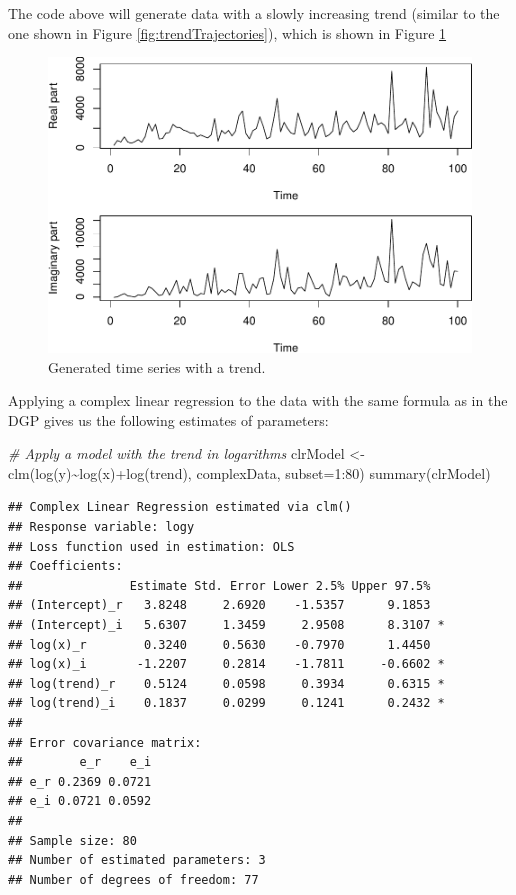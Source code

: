 \documentclass[
]{book}
\newenvironment{Shaded}{\begin{snugshade}}{\end{snugshade}}
\newcommand{\AttributeTok}[1]{\textcolor[rgb]{0.77,0.63,0.00}{#1}}
\newcommand{\CommentTok}[1]{\textcolor[rgb]{0.56,0.35,0.01}{\textit{#1}}}
\newcommand{\DecValTok}[1]{\textcolor[rgb]{0.00,0.00,0.81}{#1}}
\newcommand{\FunctionTok}[1]{\textcolor[rgb]{0.00,0.00,0.00}{#1}}
\newcommand{\NormalTok}[1]{#1}
\newcommand{\OtherTok}[1]{\textcolor[rgb]{0.56,0.35,0.01}{#1}}
\newcommand{\SpecialCharTok}[1]{\textcolor[rgb]{0.00,0.00,0.00}{#1}}
\begin{document}
The code above will generate data with a slowly increasing trend (similar to the one shown in Figure \ref{fig:trendTrajectories}), which is shown in Figure \ref{fig:dataWithTrend}

\begin{figure}
\centering
\includegraphics{Svetunkov---Svetunkov---Complex-Valued-Econometrics_files/figure-latex/dataWithTrend-1.pdf}
\caption{\label{fig:dataWithTrend}Generated time series with a trend.}
\end{figure}

Applying a complex linear regression to the data with the same formula as in the DGP gives us the following estimates of parameters:

\begin{Shaded}
\begin{Highlighting}[]
\CommentTok{\# Apply a model with the trend in logarithms}
\NormalTok{clrModel }\OtherTok{\textless{}{-}} \FunctionTok{clm}\NormalTok{(}\FunctionTok{log}\NormalTok{(y)}\SpecialCharTok{\textasciitilde{}}\FunctionTok{log}\NormalTok{(x)}\SpecialCharTok{+}\FunctionTok{log}\NormalTok{(trend), complexData, }\AttributeTok{subset=}\DecValTok{1}\SpecialCharTok{:}\DecValTok{80}\NormalTok{)}
\FunctionTok{summary}\NormalTok{(clrModel)}
\end{Highlighting}
\end{Shaded}

\begin{verbatim}
## Complex Linear Regression estimated via clm()
## Response variable: logy
## Loss function used in estimation: OLS
## Coefficients:
##               Estimate Std. Error Lower 2.5% Upper 97.5%  
## (Intercept)_r   3.8248     2.6920    -1.5357      9.1853  
## (Intercept)_i   5.6307     1.3459     2.9508      8.3107 *
## log(x)_r        0.3240     0.5630    -0.7970      1.4450  
## log(x)_i       -1.2207     0.2814    -1.7811     -0.6602 *
## log(trend)_r    0.5124     0.0598     0.3934      0.6315 *
## log(trend)_i    0.1837     0.0299     0.1241      0.2432 *
## 
## Error covariance matrix:
##        e_r    e_i
## e_r 0.2369 0.0721
## e_i 0.0721 0.0592
## 
## Sample size: 80
## Number of estimated parameters: 3
## Number of degrees of freedom: 77
\end{verbatim}
\end{document}
